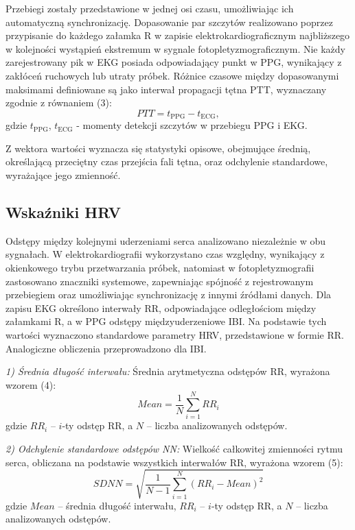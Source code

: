 \documentclass[journal]{IEEEtran}
\begin{document}
Przebiegi zostały przedstawione w jednej osi czasu, umożliwiając ich automatyczną synchronizację. Dopasowanie par szczytów realizowano poprzez przypisanie do każdego załamka R w zapisie elektrokardiograficznym najbliższego w kolejności wystąpień ekstremum w sygnale fotopletyzmograficznym. Nie każdy zarejestrowany pik w EKG posiada odpowiadający punkt w PPG, wynikający z zakłóceń ruchowych lub utraty próbek. Różnice czasowe między dopasowanymi maksimami definiowane są jako interwał propagacji tętna PTT, wyznaczany zgodnie z równaniem (3):
\begin{equation}
PTT = t_{\mathrm{PPG}} - t_{\mathrm{ECG}},
\end{equation}
gdzie $t_{\mathrm{PPG}}$, $t_{\mathrm{ECG}}$ - momenty detekcji szczytów w przebiegu PPG i EKG. 

Z wektora wartości wyznacza się statystyki opisowe, obejmujące średnią, określającą przeciętny czas przejścia fali tętna, oraz odchylenie standardowe, wyrażające jego zmienność.


\subsection{Wskaźniki HRV}
Odstępy między kolejnymi uderzeniami serca analizowano niezależnie w obu sygnałach. W elektrokardiografii wykorzystano czas względny, wynikający z okienkowego trybu przetwarzania próbek, natomiast w fotopletyzmografii zastosowano znaczniki systemowe, zapewniając spójność z rejestrowanym przebiegiem oraz umożliwiając synchronizację z innymi źródłami danych. Dla zapisu EKG określono interwały RR, odpowiadające odległościom między załamkami R, a w PPG odstępy międzyuderzeniowe IBI. Na podstawie tych wartości wyznaczono standardowe parametry HRV, przedstawione w formie RR. Analogiczne obliczenia przeprowadzono dla IBI.

\noindent\textit{1) Średnia długość interwału:} 
Średnia arytmetyczna odstępów RR, wyrażona wzorem (4):
\begin{equation}
    Mean = \frac{1}{N} \sum_{i=1}^{N} RR_i
\end{equation}
gdzie $RR_i$ -- $i$-ty odstęp RR, a $N$ – liczba analizowanych odstępów.

\noindent\textit{2) Odchylenie standardowe odstępów NN:} 
Wielkość całkowitej zmienności rytmu serca, obliczana na podstawie wszystkich interwałów RR, wyrażona wzorem (5):
\begin{equation}
    SDNN = \sqrt{\frac{1}{N-1} \sum_{i=1}^{N} (RR_i - Mean)^2}
\end{equation}
gdzie $Mean$ – średnia długość interwału, $RR_i$ – $i$-ty odstęp RR, a $N$ – liczba analizowanych odstępów. \textbf{}
\end{document}
